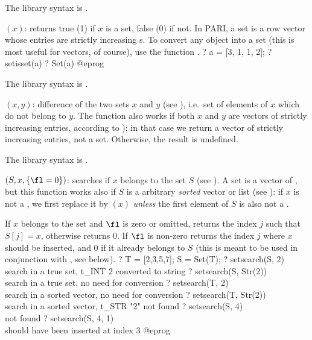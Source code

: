 The library syntax is .

$(x)$: \label{se:setisset}
returns true (1) if $x$ is a set, false (0) if
not. In PARI, a set is a row vector whose entries are strictly
increasing s. To convert any object into a set (this is most useful for
vectors, of course), use the function .
\bprog
? a = [3, 1, 1, 2];
? setisset(a)
? Set(a)
@eprog

The library syntax is .

$(x,y)$: \label{se:setminus}difference of the two sets $x$ and $y$ (see ),
i.e.~set of elements of $x$ which do not belong to $y$.
The function also works if both $x$ and $y$ are vectors of strictly increasing
entries, according to \kbd{<}); in that case we return a vector of strictly
increasing entries, not a set. Otherwise, the result is undefined.

The library syntax is .

$(S,x,\{\fl=0\})$: \label{se:setsearch}searches if $x$ belongs to the set $S$ (see ).
A set is a vector of , but this function
works also if $S$ is a arbitrary \emph{sorted} vector or list (see
): if $x$ is not a , we first
replace it by $(x)$ \emph{unless} the first element of $S$ is also
not a .

If $x$ belongs to the set and $\fl$ is zero or omitted, returns the
index $j$ such that $S[j]=x$, otherwise returns 0. If $\fl$ is non-zero
returns the index $j$ where $x$ should be inserted, and $0$ if it already
belongs to $S$ (this is meant to be used in conjunction with
, see below).
\bprog
? T = [2,3,5,7]; S = Set(T);
? setsearch(S, 2)      \\ search in a true set, t_INT 2 converted to string
? setsearch(S, Str(2)) \\ search in a true set, no need for conversion
? setsearch(T, 2)      \\ search in a sorted vector, no need for conversion
? setsearch(T, Str(2)) \\ search in a sorted vector, t_STR "2" not found
? setsearch(S, 4)      \\ not found
? setsearch(S, 4, 1)   \\ should have been inserted at index 3
@eprog


